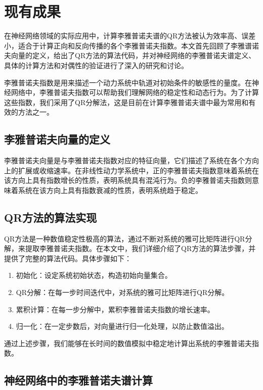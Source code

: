 \section{现有成果}

在神经网络领域的实际应用中，计算李雅普诺夫谱的QR方法被认为效率高、误差小，适合于计算正向和反向传播的各个李雅普诺夫指数。本文首先回顾了李雅谱诺夫向量的定义，给出了QR方法的算法代码，并对神经网络的李雅普诺夫谱定义、具体的计算方法和对偶性的验证进行了深入的研究和讨论。

李雅普诺夫指数是用来描述一个动力系统中轨道对初始条件的敏感性的量度。在神经网络中，李雅普诺夫指数可以帮助我们理解网络的稳定性和动态行为。为了计算这些指数，我们采用了QR分解法，这是目前在计算李雅普诺夫谱中最为常用和有效的方法之一。

\subsection{李雅普诺夫向量的定义}

李雅普诺夫向量是与李雅普诺夫指数对应的特征向量，它们描述了系统在各个方向上的扩展或收缩速率。在非线性动力学系统中，正的李雅普诺夫指数意味着系统在该方向上具有指数增长的性质，表明系统具有混沌行为。负的李雅普诺夫指数则意味着系统在该方向上具有指数衰减的性质，表明系统趋于稳定。

\subsection{QR方法的算法实现}

QR方法是一种数值稳定性极高的算法，通过不断对系统的雅可比矩阵进行QR分解，来提取李雅普诺夫指数。在本文中，我们详细介绍了QR方法的算法步骤，并提供了完整的算法代码。具体步骤如下：

\begin{enumerate}
  \item 初始化：设定系统初始状态，构造初始向量集合。
  \item QR分解：在每一步时间迭代中，对系统的雅可比矩阵进行QR分解。
  \item 累积计算：在每一步分解中，累积李雅普诺夫指数的增长速率。
  \item 归一化：在一定步数后，对向量进行归一化处理，以防止数值溢出。
\end{enumerate}

通过上述步骤，我们能够在长时间的数值模拟中稳定地计算出系统的李雅普诺夫指数。

\subsection{神经网络中的李雅普诺夫谱计算}

